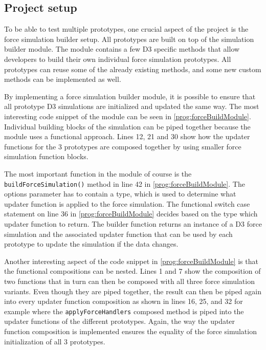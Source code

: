 \subsection{Project setup}
\label{sub:projectSetup}

To be able to test multiple prototypes, one crucial aspect of the project is the force simulation builder setup. All prototypes are built on top of the simulation builder module. The module contains a few D3 specific methods that allow developers to build their own individual force simulation prototypes. All prototypes can reuse some of the already existing methods, and some new custom methods can be implemented as well.

By implementing a force simulation builder module, it is possible to ensure that all prototype D3 simulations are initialized and updated the same way. The most interesting code snippet of the module can be seen in \ref{prog:forceBuildModule}. Individual building blocks of the simulation can be piped together because the module uses a functional approach. Lines 12, 21 and 30 show how the updater functions for the 3 prototypes are composed together by using smaller force simulation function blocks.

The most important function in the module of course is the \texttt{buildForceSimulation()} method in line 42 in \ref{prog:forceBuildModule}. The options parameter has to contain a type, which is used to determine what updater function is applied to the force simulation. The functional switch case statement on line 36 in \ref{prog:forceBuildModule} decides based on the type which updater function to return. The builder function returns an instance of a D3 force simulation and the associated updater function that can be used by each prototype to update the simulation if the data changes.

Another interesting aspect of the code snippet in \ref{prog:forceBuildModule} is that the functional compositions can be nested. Lines 1 and 7 show the composition of two functions that in turn can then be composed with all three force simulation variants. Even though they are piped together, the result can then be piped again into every updater function composition as shown in lines 16, 25, and 32 for example where the \texttt{applyForceHandlers} composed method is piped into the updater functions of the different prototypes. Again, the way the updater function composition is implemented ensures the equality of the force simulation initialization of all 3 prototypes.

